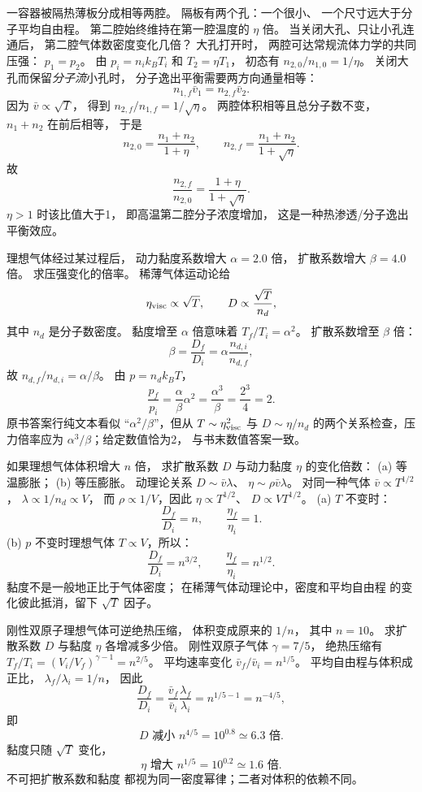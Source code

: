 一容器被隔热薄板分成相等两腔。
隔板有两个孔：一个很小、
一个尺寸远大于分子平均自由程。
第二腔始终维持在第一腔温度的
$\eta$ 倍。
当关闭大孔、只让小孔连通后，
第二腔气体数密度变化几倍？
\exsolution
大孔打开时，
两腔可达常规流体力学的共同压强：
$p_1=p_2$。
由 $p_i=n_i k_BT_i$ 和
$T_2=\eta T_1$，
初态有
$n_{2,0}/n_{1,0}=1/\eta$。
关闭大孔而保留\emph{分子流}小孔时，
分子逸出平衡需要两方向通量相等：
\[
n_{1,f}\bar v_1=n_{2,f}\bar v_2.
\]
因为 $\bar v\propto\sqrt T$，
得到
$n_{2,f}/n_{1,f}=1/\sqrt\eta$。
两腔体积相等且总分子数不变，
$n_1+n_2$ 在前后相等，
于是
\[
n_{2,0}=\frac{n_1+n_2}{1+\eta},
\qquad
n_{2,f}=\frac{n_1+n_2}{1+\sqrt\eta}.
\]
故
\[
\boxed{\frac{n_{2,f}}{n_{2,0}}
=\frac{1+\eta}{1+\sqrt\eta}}.
\]
\excheck $\eta>1$ 时该比值大于1，
即高温第二腔分子浓度增加，
这是一种热渗透/分子逸出平衡效应。

理想气体经过某过程后，
动力黏度系数增大
$\alpha=2.0$ 倍，
扩散系数增大
$\beta=4.0$ 倍。
求压强变化的倍率。
\exsolution
稀薄气体运动论给
\[
\eta_{\rm visc}\propto\sqrt T,\qquad
D\propto\frac{\sqrt T}{n_d},
\]
其中 $n_d$ 是分子数密度。
黏度增至 $\alpha$ 倍意味着
$T_f/T_i=\alpha^2$。
扩散系数增至 $\beta$ 倍：
\[
\beta=\frac{D_f}{D_i}
=\alpha\frac{n_{d,i}}{n_{d,f}},
\]
故
$n_{d,f}/n_{d,i}=\alpha/\beta$。
由 $p=n_dk_BT$，
\[
\boxed{\frac{p_f}{p_i}
=\frac{\alpha}{\beta}\alpha^2
=\frac{\alpha^3}{\beta}
=\frac{2^3}{4}=2}.
\]
\excheck 原书答案行纯文本看似
“$\alpha^2/\beta$”，但从
$T\sim\eta_{\rm visc}^2$ 与 $D\sim\eta/n_d$
的两个关系检查，压力倍率应为
$\alpha^3/\beta$；给定数值恰为2，
与书末数值答案一致。

如果理想气体体积增大 $n$ 倍，
求扩散系数 $D$ 与动力黏度 $\eta$
的变化倍数：
(a) 等温膨胀；
(b) 等压膨胀。
\exsolution
动理论关系
$D\sim\bar v\lambda$、
$\eta\sim\rho\bar v\lambda$。
对同一种气体
$\bar v\propto T^{1/2}$，
$\lambda\propto1/n_d\propto V$，
而 $\rho\propto1/V$，因此
$\eta\propto T^{1/2}$、
$D\propto V T^{1/2}$。
(a) $T$ 不变时：
\[
\boxed{\frac{D_f}{D_i}=n,\qquad
\frac{\eta_f}{\eta_i}=1}.
\]
(b) $p$ 不变时理想气体
$T\propto V$，所以：
\[
\boxed{\frac{D_f}{D_i}=n^{3/2},\qquad
\frac{\eta_f}{\eta_i}=n^{1/2}}.
\]
\excheck 黏度不是一般地正比于气体密度；
在稀薄气体动理论中，密度和平均自由程
的变化彼此抵消，留下 $\sqrt T$ 因子。

刚性双原子理想气体可逆绝热压缩，
体积变成原来的 $1/n$，
其中 $n=10$。
求扩散系数 $D$ 与黏度 $\eta$
各增减多少倍。
\exsolution
刚性双原子气体
$\gamma=7/5$，
绝热压缩有
$T_f/T_i=(V_i/V_f)^{\gamma-1}
=n^{2/5}$。
平均速率变化
$\bar v_f/\bar v_i=n^{1/5}$。
平均自由程与体积成正比，
$\lambda_f/\lambda_i=1/n$，
因此
\[
\frac{D_f}{D_i}
=\frac{\bar v_f}{\bar v_i}
\frac{\lambda_f}{\lambda_i}
=n^{1/5-1}=n^{-4/5},
\]
即
\[
\boxed{D\text{ 减小 }n^{4/5}=10^{0.8}
\simeq6.3\text{ 倍}}.
\]
黏度只随 $\sqrt T$ 变化，
\[
\boxed{\eta\text{ 增大 }n^{1/5}
=10^{0.2}\simeq1.6\text{ 倍}}.
\]
\excheck 不可把扩散系数和黏度
都视为同一密度幂律；二者对体积的依赖不同。

